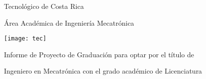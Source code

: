 
\thispagestyle{empty} 

\begin{center}

Tecnológico de Costa Rica

\par\vspace{1ex}

\'Area Acad\'emica de Ingeniería Mecatrónica

\par\vspace{20mm}

\texttt{[image: tec]}

\par\vspace*{\fill}

{\large\bf{\scriptTitle}}

\par\vspace*{\fill}

Informe de Proyecto de Graduación para optar por el título de

Ingeniero en Mecatrónica con el grado académico de Licenciatura

\par\vspace{20mm}

\scriptAuthor

\vspace*{\fill}


\end{center}
\newpage 
\cleardoublepage 


